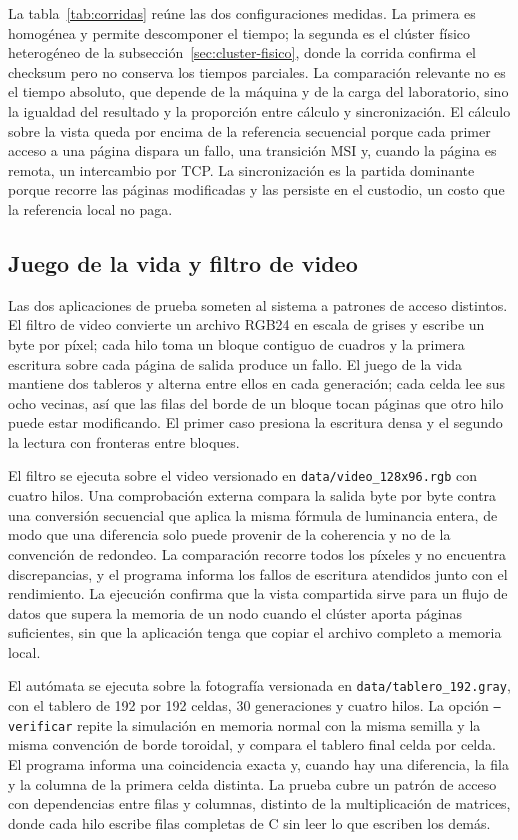 La tabla~\ref{tab:corridas} reúne las dos configuraciones medidas. La primera es homogénea y permite descomponer el tiempo; la segunda es el clúster físico heterogéneo de la subsección~\ref{sec:cluster-fisico}, donde la corrida confirma el checksum pero no conserva los tiempos parciales. La comparación relevante no es el tiempo absoluto, que depende de la máquina y de la carga del laboratorio, sino la igualdad del resultado y la proporción entre cálculo y sincronización. El cálculo sobre la vista queda por encima de la referencia secuencial porque cada primer acceso a una página dispara un fallo, una transición MSI y, cuando la página es remota, un intercambio por TCP. La sincronización es la partida dominante porque recorre las páginas modificadas y las persiste en el custodio, un costo que la referencia local no paga.

\subsection{Juego de la vida y filtro de video}

Las dos aplicaciones de prueba someten al sistema a patrones de acceso distintos. El filtro de video convierte un archivo RGB24 en escala de grises y escribe un byte por píxel; cada hilo toma un bloque contiguo de cuadros y la primera escritura sobre cada página de salida produce un fallo. El juego de la vida mantiene dos tableros y alterna entre ellos en cada generación; cada celda lee sus ocho vecinas, así que las filas del borde de un bloque tocan páginas que otro hilo puede estar modificando. El primer caso presiona la escritura densa y el segundo la lectura con fronteras entre bloques.

El filtro se ejecuta sobre el video versionado en \texttt{data/video\_128x96.rgb} con cuatro hilos. Una comprobación externa compara la salida byte por byte contra una conversión secuencial que aplica la misma fórmula de luminancia entera, de modo que una diferencia solo puede provenir de la coherencia y no de la convención de redondeo. La comparación recorre todos los píxeles y no encuentra discrepancias, y el programa informa los fallos de escritura atendidos junto con el rendimiento. La ejecución confirma que la vista compartida sirve para un flujo de datos que supera la memoria de un nodo cuando el clúster aporta páginas suficientes, sin que la aplicación tenga que copiar el archivo completo a memoria local.

El autómata se ejecuta sobre la fotografía versionada en \texttt{data/tablero\_192.gray}, con el tablero de 192 por 192 celdas, 30 generaciones y cuatro hilos. La opción \texttt{--verificar} repite la simulación en memoria normal con la misma semilla y la misma convención de borde toroidal, y compara el tablero final celda por celda. El programa informa una coincidencia exacta y, cuando hay una diferencia, la fila y la columna de la primera celda distinta. La prueba cubre un patrón de acceso con dependencias entre filas y columnas, distinto de la multiplicación de matrices, donde cada hilo escribe filas completas de C sin leer lo que escriben los demás.

